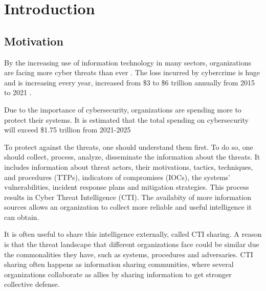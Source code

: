 \chapter{Introduction}


\lipsum[1-2]  %

\section{Motivation}

By the increasing use of information technology in many sectors, organizations are facing more cyber threats than ever \cite{skopik_problem_2016}. The loss incurred by cybercrime is huge and is  increasing every year, increased from \$3 to \$6 trillion annually from 2015 to 2021 \cite{noauthor_2023_nodate}.

Due to the importance of cybersecurity, organizations are spending more to protect their systems. It is estimated that the total spending on cybersecurity will exceed \$1.75 trillion from 2021-2025 \cite{freeze_global_2021}

To protect against the threats, one should understand them first. To do so, one should collect, process, analyze, disseminate the information about the threats. It includes information about threat actors, their motivations, tactics, techniques, and procedures (TTPs), indicators of compromises (IOCs), the systems' vulnerabilities, incident response plans and mitigation strategies. This process results in Cyber Threat Intelligence (CTI). The availabity of more information sources allows an organization to collect more reliable and useful intelligence it can obtain.

It is often useful to share this intelligence externally, called CTI sharing. A reason is that the threat landscape that different organizations face could be similar due the commonalities they have, such as systems, procedures and adversaries. CTI sharing often happens as information sharing communities, where several organizations collaborate as allies by sharing information to get stronger collective defense.

